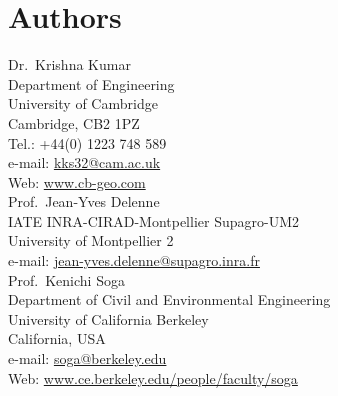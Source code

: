 \documentclass[12pt,twoside]{tuhhproc-en}
\begin{document}

{\renewcommand{\markboth}[2]{}%
  \printbibliography}

\section*{Authors}\small
Dr.\ Krishna Kumar\\
Department of Engineering \\
University of Cambridge \\
Cambridge, CB2 1PZ\\
Tel.: +44(0) 1223 748 589\\
e-mail: \url{kks32@cam.ac.uk}\\
Web: \url{www.cb-geo.com}\\

Prof.\ Jean-Yves Delenne\\
IATE INRA-CIRAD-Montpellier Supagro-UM2\\
University of Montpellier 2 \\
e-mail: \url{jean-yves.delenne@supagro.inra.fr}\\

Prof.\ Kenichi Soga\\
Department of Civil and Environmental Engineering \\
University of California Berkeley \\
California, USA\\
e-mail: \url{soga@berkeley.edu}\\
Web: \url{www.ce.berkeley.edu/people/faculty/soga}\\
\end{document}
